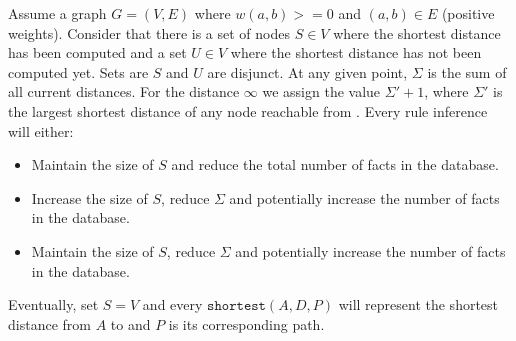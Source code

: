 \begin{theorem}[Correctness]

   Assume a graph $G = (V, E)$ where $w(a, b) >= 0$ and $(a, b) \in E$ (positive
   weights). Consider that there is a set of nodes $S \in V$ where the shortest
   distance has been computed and a set $U \in V$ where the shortest distance
   has not been computed yet. Sets are $S$ and $U$ are disjunct. At any given
   point, $\Sigma$ is the sum of all current distances. For the
   distance $\infty$ we assign the value $\Sigma' + 1$, where $\Sigma'$ is the
   largest shortest distance of any node reachable from . Every rule
   inference will either:

   \begin{itemize}
      \item Maintain the size of $S$ and reduce the total number of facts in
         the database.
      \item Increase the size of $S$, reduce $\Sigma$ and potentially increase the number of
         facts in the database.
      \item Maintain the size of $S$, reduce $\Sigma$
         and potentially increase the number of facts in the database.
   \end{itemize}

   Eventually, set $S = V$ and every $\mathtt{shortest}(A, D, P)$ will represent
   the shortest distance from $A$ to  and $P$ is its corresponding
   path.

\end{theorem}

